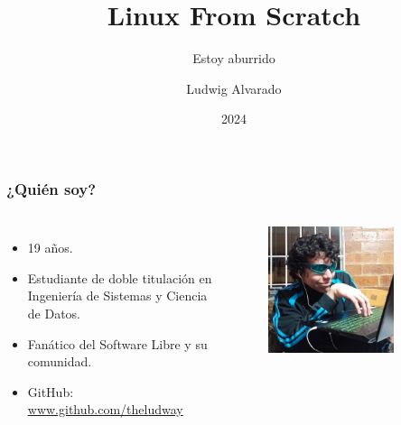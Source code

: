 \documentclass{beamer}
\title[LFS]
{Linux From Scratch}
\subtitle{Estoy aburrido}
\author[Ludway]
{Ludwig Alvarado}
\date[2024]
{2024}
\begin{document}
\frame{\titlepage}

\begin{frame}
  \frametitle{¿Quién soy?}
  \begin{columns}
    \begin{itemize}
      \item 19 años.
      \item Estudiante de doble titulación en Ingeniería de Sistemas y Ciencia de Datos.
      \item Fanático del Software Libre y su comunidad.
      \item GitHub: \url{www.github.com/theludway}
    \end{itemize}
    \begin{figure}
      \centering
      \includegraphics[width=0.8\textwidth]{img/Yo.jpg}
    \end{figure}
  \end{columns}
\end{frame}
\end{document}
